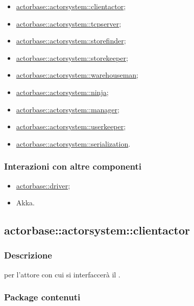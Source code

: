 \documentclass{scalatekids-article}
\begin{document}
\begin{itemize}
\item \hyperref[sec:actorbase::actorsystem::actorclient]{actorbase::actorsystem::clientactor};
\item \hyperref[sec:actorbase::actorsystem::actorclient]{actorbase::actorsystem::tcpserver};
\item \hyperref[sec:actorbase::actorsystem::actorclient]{actorbase::actorsystem::storefinder};
\item \hyperref[sec:actorbase::actorsystem::actorclient]{actorbase::actorsystem::storekeeper};
\item \hyperref[sec:actorbase::actorsystem::actorclient]{actorbase::actorsystem::warehouseman};
\item \hyperref[sec:actorbase::actorsystem::actorclient]{actorbase::actorsystem::ninja};
\item \hyperref[sec:actorbase::actorsystem::actorclient]{actorbase::actorsystem::manager};
\item \hyperref[sec:actorbase::actorsystem::actorclient]{actorbase::actorsystem::userkeeper};
\item \hyperref[sec:actorbase::actorsystem::actorclient]{actorbase::actorsystem::serialization}.
\end{itemize}

\subsubsection{Interazioni con altre componenti}

\begin{itemize}
\item \hyperref[sec:actorbase::driver]{actorbase::driver};
\item Akka.
\end{itemize}

\subsection{actorbase::actorsystem::clientactor}
\label{sec:actorbase::actorsystem::clientactor}

\subsubsection{Descrizione}

 per l'attore con cui si interfaccerà il .

\subsubsection{Package contenuti}
\end{document}
